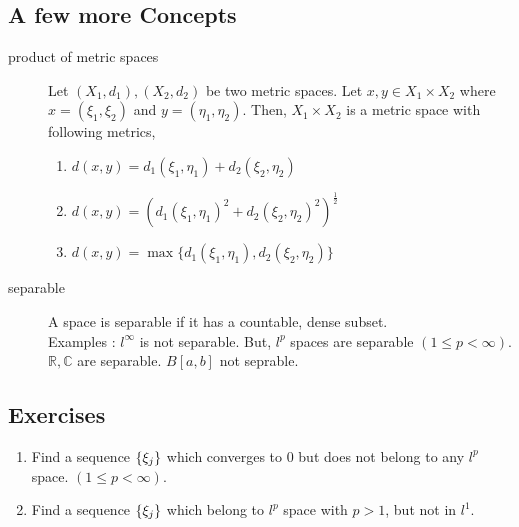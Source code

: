 \subsection*{A few more Concepts}
\begin{description}
	\item[product of metric spaces]
		Let $(X_1,d_1),(X_2,d_2)$ be two metric spaces.
		Let $x,y \in X_1 \times X_2$ where $x = (\xi_1,\xi_2 )$ and $y = (\eta_1,\eta_2)$.
		Then, $X_1 \times X_2$ is a metric space with following metrics,
		\begin{enumerate}
			\item $\displaystyle d(x,y) = d_1\left(\xi_1,\eta_1\right) + d_2\left(\xi_2,\eta_2\right)$
			\item $\displaystyle d(x,y) = \left( d_1\left( \xi_1,\eta_1 \right)^2 + d_2\left(\xi_2,\eta_2\right)^2 \right)^\frac{1}{2}$
			\item $\displaystyle d(x,y) = \max \{ d_1 \left(\xi_1,\eta_1\right) , d_2\left(\xi_2,\eta_2\right) \}$
		\end{enumerate}
	\item[separable] A space is separable if it has a countable, dense subset.\\
		Examples : $l^\infty$ is not separable. But, $l^p$ spaces are separable $(1 \le p <\infty)$. $\mathbb{R},\mathbb{C}$ are separable. $B[a,b]$ not seprable.
\end{description}
\subsection*{Exercises}
\begin{enumerate}
	\item Find a sequence $\left\{\xi_j\right\}$ which converges to $0$ but does not belong to any $l^p$ space. $(1 \le p < \infty)$.
	\item Find a sequence $\left\{\xi_j\right\}$ which belong to $l^p$ space with $p>1$, but not in $l^1$.
\end{enumerate}

\setcounter{subsection}{4}
